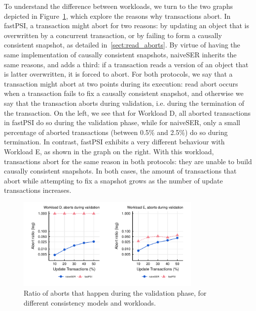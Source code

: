 To understand the difference between workloads, we turn to the two graphs depicted in Figure~\ref{fig:raw_abort_rate_2pc}, which explore the reasons why transactions abort. In fastPSI, a transaction might abort for two reasons: by updating an object that is overwritten by a concurrent transaction, or by failing to form a causally consistent snapshot, as detailed in~\ref{sect:read_aborts}. By virtue of having the same implementation of causally consistent snapshots, naiveSER inherits the same reasons, and adds a third: if a transaction reads a version of an object that is latter overwritten, it is forced to abort. For both protocols, we say that a transaction might abort at two points during its execution: read abort occurs when a transaction fails to fix a causally consistent snapshot, and otherwise we say that the transaction aborts during validation, i.e. during the termination of the transaction. On the left, we see that for Workload D, all aborted transactions in fastPSI do so during the validation phase, while for naiveSER, only a small percentage of aborted transactions (between 0.5\% and 2.5\%) do so during termination. In contrast, fastPSI exhibits a very different behaviour with Workload E, as shown in the graph on the right. With this workload, transactions abort for the same reason in both protocols: they are unable to build causally consistent snapshots. In both cases, the amount of transactions that abort while attempting to fix a snapshot grows as the number of update transactions increases.

\begin{figure}[t]
\begin{center}
\includegraphics[width=0.8\textwidth]{figures/abort_rate_bench_2pc.pdf}
\vspace{-0.75cm}
\end{center}
\caption{Ratio of aborts that happen during the validation phase, for different consistency models and workloads.}
\label{fig:raw_abort_rate_2pc}
\end{figure}

